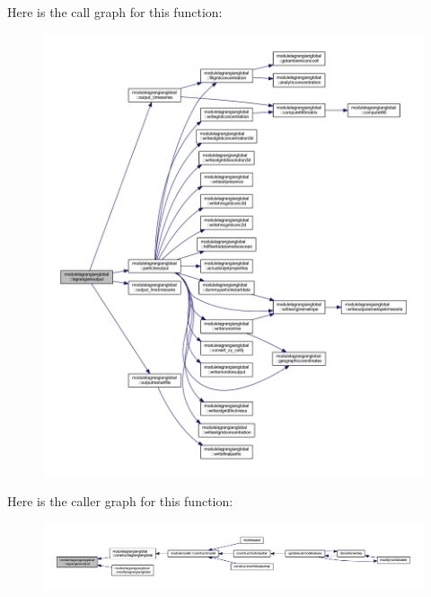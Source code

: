 Here is the call graph for this function\+:\nopagebreak
\begin{figure}[H]
\begin{center}
\leavevmode
\includegraphics[width=350pt]{namespacemodulelagrangianglobal_a3e9da0dad79c6c6965b34c4f0d9232a0_cgraph}
\end{center}
\end{figure}
Here is the caller graph for this function\+:\nopagebreak
\begin{figure}[H]
\begin{center}
\leavevmode
\includegraphics[width=350pt]{namespacemodulelagrangianglobal_a3e9da0dad79c6c6965b34c4f0d9232a0_icgraph}
\end{center}
\end{figure}
\mbox{\label{namespacemodulelagrangianglobal_a4cefc1989887113dc6c716f228c4772f}} 
